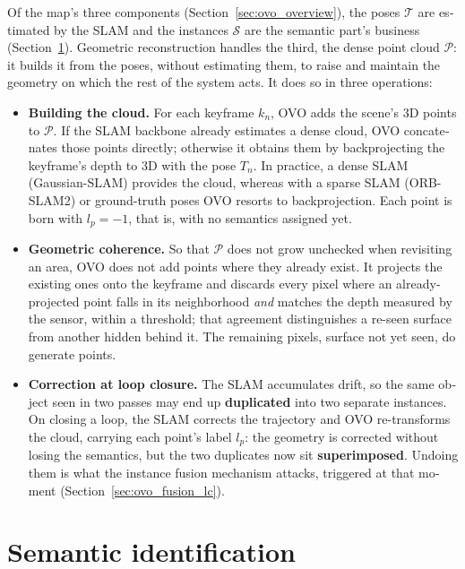 \begin{otherlanguage}{english}
Of the map's three components (Section~\ref{sec:ovo_overview}), the poses $\mathcal{T}$ are estimated
by the SLAM and the instances $\mathcal{S}$ are the semantic part's business
(Section~\ref{sec:ovo_semantic}). Geometric reconstruction handles the third, the dense point cloud
$\mathcal{P}$: it builds it from the poses, without estimating them, to raise and maintain the
geometry on which the rest of the system acts. It does so in three operations:

\begin{itemize}
  \item \textbf{Building the cloud.} For each keyframe $k_n$, OVO adds the scene's 3D points to
    $\mathcal{P}$. If the SLAM backbone already estimates a dense cloud, OVO concatenates those points
    directly; otherwise it obtains them by backprojecting the keyframe's depth to 3D with the pose
    $T_n$. In practice, a dense SLAM (Gaussian-SLAM) provides the cloud, whereas with a sparse SLAM
    (ORB-SLAM2) or ground-truth poses OVO resorts to backprojection. Each point is born with
    $l_p = -1$, that is, with no semantics assigned yet.
  \item \textbf{Geometric coherence.} So that $\mathcal{P}$ does not grow unchecked when revisiting an
    area, OVO does not add points where they already exist. It projects the existing ones onto the
    keyframe and discards every pixel where an already-projected point falls in its neighborhood
    \emph{and} matches the depth measured by the sensor, within a threshold; that agreement
    distinguishes a re-seen surface from another hidden behind it. The remaining pixels, surface not
    yet seen, do generate points.
  \item \textbf{Correction at loop closure.} The SLAM accumulates drift, so the same object seen in
    two passes may end up \textbf{duplicated} into two separate instances. On closing a loop, the
    SLAM corrects the trajectory and OVO re-transforms the cloud, carrying each point's label $l_p$:
    the geometry is corrected without losing the semantics, but the two duplicates now sit
    \textbf{superimposed}. Undoing them is what the instance fusion mechanism attacks, triggered at
    that moment (Section~\ref{sec:ovo_fusion_lc}).
\end{itemize}

\section{Semantic identification}
\label{sec:ovo_semantic}


\end{otherlanguage}
